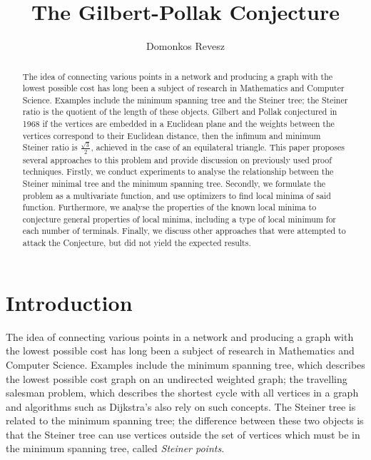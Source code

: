 \documentclass{mpaper}
\begin{document}
\newtheorem{lemma}{Lemma}
\newtheorem{theorem}{Theorem}
\newtheorem{conjecture}{Conjecture}
\theoremstyle{definition}
\newtheorem{definition}{Definition}
\newtheorem*{remark}{Remark}

\title{The Gilbert-Pollak Conjecture}
\author{Domonkos Revesz}

\maketitle

\begin{abstract}
The idea of connecting various points in a network and producing a graph with the lowest possible cost has long been a subject of research in Mathematics and Computer Science. Examples include the minimum spanning tree and the Steiner tree; the Steiner ratio is the quotient of the length of these objects. Gilbert and Pollak conjectured in 1968 \cite{GP1968} if the vertices are embedded in a Euclidean plane and the weights between the vertices correspond to their Euclidean distance, then the infimum and minimum Steiner ratio is $\frac{\sqrt{3}}{2}$, achieved in the case of an equilateral triangle. This paper proposes several approaches to this problem and provide discussion on previously used proof techniques. Firstly, we conduct experiments to analyse the relationship between the Steiner minimal tree and the minimum spanning tree. Secondly, we formulate the problem as a multivariate function, and use optimizers to find local minima of said function. Furthermore, we analyse the properties of the known local minima to conjecture general properties of local minima, including a type of local minimum for each number of terminals. Finally, we discuss other approaches that were attempted to attack the Conjecture, but did not yield the expected results.
\end{abstract}

\section{Introduction}

The idea of connecting various points in a network and producing a graph with the lowest possible cost has long been a subject of research in Mathematics and Computer Science. Examples include the minimum spanning tree, which describes the lowest possible cost graph on an undirected weighted graph; the travelling salesman problem, which describes the shortest cycle with all vertices in a graph and algorithms such as Dijkstra's also rely on such concepts. The Steiner tree is related to the minimum spanning tree; the difference between these two objects is that the Steiner tree can use vertices outside the set of vertices which must be in the minimum spanning tree, called \emph{Steiner points}.
\end{document}
